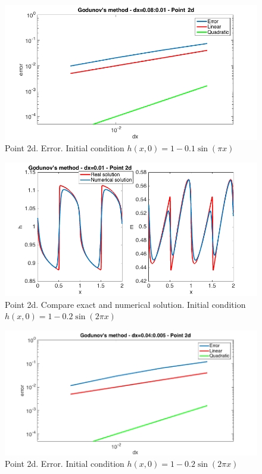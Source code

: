 \documentclass[oneside,12pt]{book}  %
\theoremstyle{plain}
\theoremstyle{definition}
\theoremstyle{remark}
\numberwithin{equation}{chapter} %
\begin{document}
\begin{figure}[h]
\label{img:roe_2c_1_error}
\centering
\includegraphics[scale=0.5]{Immagini/LF/2c-1-error.png}
\caption{Point 2d. Error. Initial condition $h(x,0)=1-0.1\sin(\pi x)$}
\end{figure}

\begin{figure}[h]
\label{img:roe_2c_2_solution}
\centering
\includegraphics[scale=0.5]{Immagini/LF/2c-2-solution.png}
\caption{Point 2d. Compare exact and numerical solution. Initial condition $h(x,0)=1-0.2\sin(2\pi x)$}
\end{figure}

\begin{figure}[h]
\label{img:roe_2c_2_error}
\centering
\includegraphics[scale=0.5]{Immagini/LF/2c-2-error.png}
\caption{Point 2d. Error. Initial condition $h(x,0)=1-0.2\sin(2\pi x)$}
\end{figure}
\end{document}
